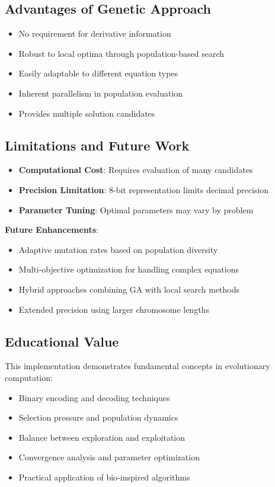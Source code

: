 \documentclass[11pt,a4paper]{article}
\begin{document}
\subsection{Advantages of Genetic Approach}
\begin{itemize}
    \item No requirement for derivative information
    \item Robust to local optima through population-based search
    \item Easily adaptable to different equation types
    \item Inherent parallelism in population evaluation
    \item Provides multiple solution candidates
\end{itemize}

\subsection{Limitations and Future Work}
\begin{itemize}
    \item \textbf{Computational Cost}: Requires evaluation of many candidates
    \item \textbf{Precision Limitation}: 8-bit representation limits decimal precision
    \item \textbf{Parameter Tuning}: Optimal parameters may vary by problem
\end{itemize}

\textbf{Future Enhancements}:
\begin{itemize}
    \item Adaptive mutation rates based on population diversity
    \item Multi-objective optimization for handling complex equations
    \item Hybrid approaches combining GA with local search methods
    \item Extended precision using larger chromosome lengths
\end{itemize}

\subsection{Educational Value}
This implementation demonstrates fundamental concepts in evolutionary computation:
\begin{itemize}
    \item Binary encoding and decoding techniques
    \item Selection pressure and population dynamics
    \item Balance between exploration and exploitation
    \item Convergence analysis and parameter optimization
    \item Practical application of bio-inspired algorithms
\end{itemize}
\end{document}
